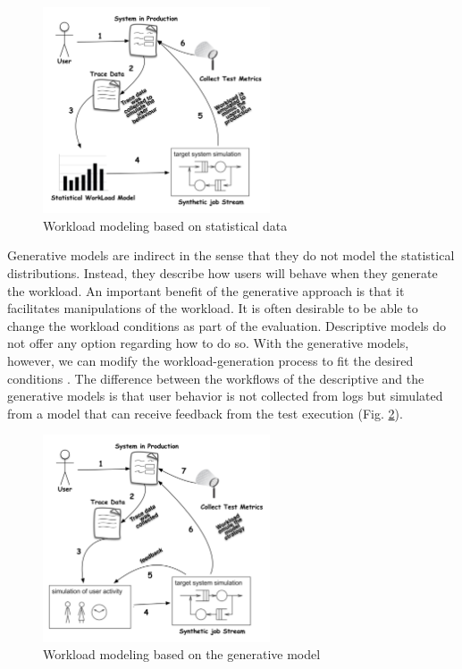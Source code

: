 \documentclass[espaco=umemeio,chapter=TITLE,twoside,openright]{abnt}
\begin{document}
\begin{figure}[!ht]

\centering
\includegraphics[width=0.6\textwidth]{./images/workloadmodel1300dpi.png}
\caption{Workload modeling based on statistical data \cite{DiLucca2006}}
\label{fig:descriptivemodel}
\end{figure}


Generative models are indirect in the sense that they do not model the statistical distributions. Instead, they describe how users will behave when they generate the workload. An important benefit of the generative approach is that it facilitates manipulations of the workload. It is often desirable to be able to change the workload conditions as part of the evaluation. Descriptive models do not offer any option regarding how to do so. With the generative models, however, we can modify the workload-generation process to fit the desired conditions \cite{Feitelson2013}. The difference between the workflows of the descriptive and the generative models is that user behavior is not collected from logs but simulated from a model that can receive feedback from the test execution (Fig. \ref{fig:generativemodel}).


\begin{figure}[h]
\centering
\includegraphics[width=0.6\textwidth]{./images/workloadmodel2300dpi.png}
\caption{Workload modeling based on the generative model \cite{DiLucca2006}}
\label{fig:generativemodel}

\end{figure}
\end{document}
